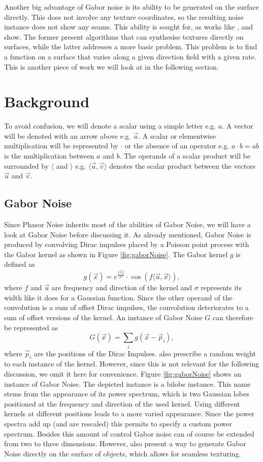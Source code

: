 \documentclass{utue} %
\begin{document}
Another big advantage of Gabor noise is its ability to be generated on the surface directly. This does not involve any texture coordinates, so the resulting noise instance does not show any seams. This ability is sought for, as works like \cite{appearanceTextureSynthesis}, \cite{textureSynthesis} and \cite{stripes} show. The former present algorithms that can synthesise textures directly on surfaces, while the latter addresses a more basic problem. This problem is to find a function on a surface that varies along a given direction field with a given rate. This is another piece of work we will look at in the following section.

\section{Background}
To avoid confusion, we will denote a scalar using a simple letter e.g. $a$. A vector will be denoted with an arrow above e.g. $\vec{u}$. A scalar or elementwise multiplication will be represented by $\cdot$ or the absence of an operator e.g. $a\cdot b=ab$ is the multiplication between $a$ and $b$. The operands of a scalar product will be surrounded by $\langle$ and $\rangle$ e.g. $\langle\vec{u},\vec{v}\rangle$ denotes the scalar product between the vectors $\vec{u}$ and $\vec{v}$.

\subsection{Gabor Noise}
Since Phasor Noise inherits most of the abilities of Gabor Noise, we will have a look at Gabor Noise before discussing it. As already mentioned, Gabor Noise is produced by convolving Dirac impulses placed by a Poisson point process with the Gabor kernel as shown in Figure \ref{fig:gaborNoise}. The Gabor kernel $g$ is defined as
$$
g(\vec{x}) = e^{\frac{||\vec{x}||}{\sigma^2}}\cdot \cos{(f\langle\vec{u},\vec{x}\rangle)},
$$
where $f$ and $\vec{u}$ are frequency and direction of the kernel and $\sigma$ represents its width like it does for a Gaussian function. Since the other operand of the convolution is a sum of offset Dirac impulses, the convolution deteriorates to a sum of offset versions of the kernel. An instance of Gabor Noise $G$ can therefore be represented as
$$
G(\vec{x}) = \sum_ig(\vec{x}-\vec{p}_i),
$$
where $\vec{p}_i$ are the positions of the Dirac Impulses. \citeauthor{gaborNoise} also prescribe a random weight to each instance of the kernel. However, since this is not relevant for the following discussion, we omit it here for convenience. Figure \ref{fig:gaborNoise} shows an instance of Gabor Noise. The depicted instance is a bilobe instance. This name stems from the appearance of its power spectrum, which is two Gaussian lobes positioned at the frequency and direction of the used kernel. Using different kernels at different positions leads to a more varied appearance. Since the power spectra add up (and are rescaled) this permits to specify a custom power spectrum. Besides this amount of control Gabor noise can of course be extended from two to three dimensions. However, \citeauthor{gaborNoise} also present a way to generate Gabor Noise directly on the surface of objects, which allows for seamless texturing.
\end{document}
